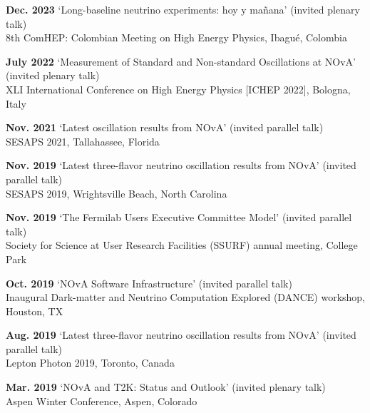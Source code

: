 \documentclass[margin, line]{res}
\renewcommand{\em}{\upshape\sffamily}
\begin{document}
\begin{resume}
{\bf Dec. 2023} `Long-baseline neutrino experiments: hoy y mañana' {\em (invited plenary talk)}\\
8th ComHEP: Colombian Meeting on High Energy Physics, Ibagué, Colombia\\
\vspace{-.3cm}

{\bf July 2022} `Measurement of Standard and Non-standard Oscillations at NOvA' {\em (invited plenary talk)}\\
XLI International Conference on High Energy Physics [ICHEP 2022], Bologna, Italy\\
\vspace{-.3cm}

{\bf Nov. 2021} `Latest oscillation results from NOvA' {\em (invited parallel talk)}\\
SESAPS 2021, Tallahassee, Florida\\
\vspace{-.3cm}

{\bf Nov. 2019} `Latest three-flavor neutrino oscillation results from NOvA' {\em (invited parallel talk)}\\
SESAPS 2019, Wrightsville Beach, North Carolina\\
\vspace{-.3cm}

{\bf Nov. 2019} `The Fermilab Users Executive Committee Model' {\em (invited parallel talk)}\\
Society for Science at User Research Facilities (SSURF) annual meeting, College Park\\
\vspace{-.3cm}

{\bf Oct. 2019} `NOvA Software Infrastructure' {\em (invited parallel talk)}\\
Inaugural Dark-matter and Neutrino Computation Explored (DANCE) workshop, Houston, TX\\
\vspace{-.3cm}

{\bf Aug. 2019} `Latest three-flavor neutrino oscillation results from NOvA' {\em (invited parallel talk)}\\
Lepton Photon 2019, Toronto, Canada\\
\vspace{-.3cm}

{\bf Mar. 2019} `NOvA and T2K: Status and Outlook' {\em (invited plenary talk)}\\
Aspen Winter Conference, Aspen, Colorado\\
\vspace{-.3cm}


\end{resume}
\end{document}
